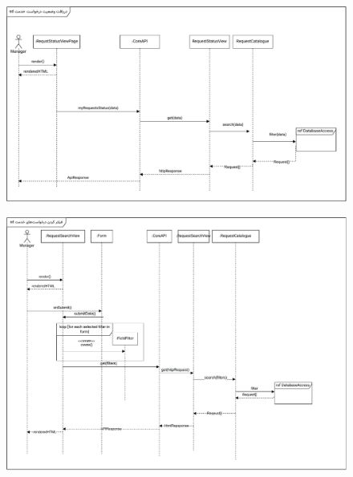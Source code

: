 \begin{figure}[ht!]
	\centering
	\includegraphics[scale=0.8]{figs/design-sequence/3-32.pdf}
\end{figure}

\FloatBarrier
\newpage

\eject \pdfpagewidth=10in \pdfpageheight=9in

\begin{figure}[ht!]
	\centering
	\includegraphics[scale=0.8]{figs/design-sequence/3-33.pdf}
\end{figure}

\FloatBarrier
\newpage

\eject \pdfpagewidth=10in \pdfpageheight=9in

